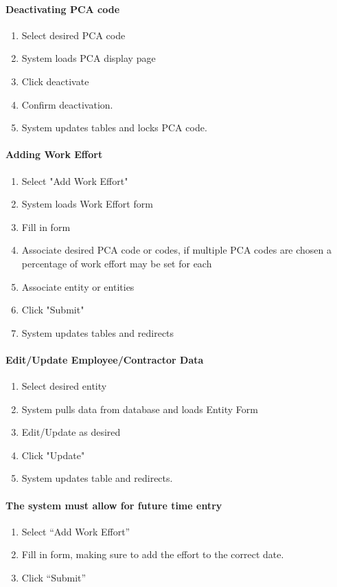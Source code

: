\documentclass[letterpaper]{article}
\begin{document}
\paragraph{Deactivating PCA code}
\begin{enumerate}
\item Select desired PCA code
\item System loads PCA display page
\item Click deactivate
\item Confirm deactivation.
\item System updates tables and locks PCA code.
\end{enumerate}

\paragraph{Adding Work Effort}
\begin{enumerate}
\item Select "Add Work Effort"
\item System loads Work Effort form
\item Fill in form
\item Associate desired PCA code or codes, if multiple PCA codes are chosen a percentage of work effort may be set for each
\item Associate entity or entities
\item Click "Submit"
\item System updates tables and redirects
\end{enumerate}

\paragraph{Edit/Update Employee/Contractor Data}
\begin{enumerate}
\item Select desired entity
\item System pulls data from database and loads Entity Form
\item Edit/Update as desired
\item Click "Update"
\item System updates table and redirects.
\end{enumerate}

\paragraph{The system must allow for future time entry}
\begin{enumerate}
\item Select ``Add Work Effort''
\item Fill in form, making sure to add the effort to the correct date.
\item Click ``Submit''
\end{enumerate}
\end{document}
